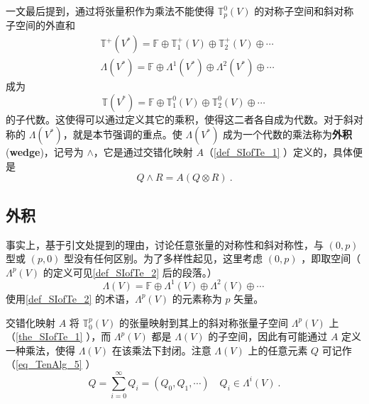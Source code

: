 



一文最后提到，通过将张量积作为乘法不能使得 $\mathbb T_p^0(V)$ 的对称子空间和斜对称子空间的外直和 
\begin{equation}
\begin{aligned}
&\mathbb T^+(V^*)=\mathbb F\oplus\mathbb T_1^+(V)\oplus\mathbb T_2^+(V)\oplus\cdots\\
&\Lambda(V^*)=\mathbb F\oplus \Lambda^1(V^*)\oplus\Lambda^2(V^*)\oplus\cdots
\end{aligned}~
\end{equation}
成为 
\begin{equation}
\mathbb T(V^*)=\mathbb F\oplus\mathbb T_1^0(V)\oplus\mathbb T_2^0(V)\oplus\cdots~
\end{equation}
的子代数。这使得可以通过定义其它的乘积，使得这二者各自成为代数。对于斜对称的 $\Lambda(V^*)$，就是本节强调的重点。使 $\Lambda(V^*)$ 成为一个代数的乘法称为\textbf{外积}(\textbf{wedge})，记号为 $\wedge$，它是通过交错化映射 $A$（\autoref{def_SIofTe_1}  ）定义的，具体便是
\begin{equation}
Q\wedge R=A(Q\otimes R)~.
\end{equation}

\subsection{外积}
事实上，基于引文处提到的理由，讨论任意张量的对称性和斜对称性，与 $(0,p)$型或 $(p,0)$ 型没有任何区别。为了多样性起见，这里考虑 $(0,p)$ ，即取空间（$\Lambda^p(V)$ 的定义可见\autoref{def_SIofTe_2} 后的段落。） 
\begin{equation}\label{eq_WegofT_9}
\Lambda(V)=\mathbb F\oplus \Lambda^1(V)\oplus\Lambda^2(V)\oplus\cdots~
\end{equation}
使用\autoref{def_SIofTe_2}  的术语，$\Lambda^p(V)$ 的元素称为 $p$ 矢量。

交错化映射 $A$ 将 $\mathbb T_0^p(V)$ 的张量映射到其上的斜对称张量子空间 $\Lambda^p(V)$ 上（\autoref{the_SIofTe_1}  ），而 $\Lambda^p(V)$ 都是 $\Lambda(V)$ 的子空间，因此有可能通过 $A$ 定义一种乘法，使得 $\Lambda(V)$ 在该乘法下封闭。注意 $ \Lambda(V)$ 上的任意元素 $Q$ 可记作（\autoref{eq_TenAlg_5}  ）
\begin{equation}\label{eq_WegofT_2}
Q=\sum_{i=0}^\infty Q_i=(Q_0,Q_1,\cdots) \quad Q_i\in\Lambda^i(V)~.
\end{equation}

